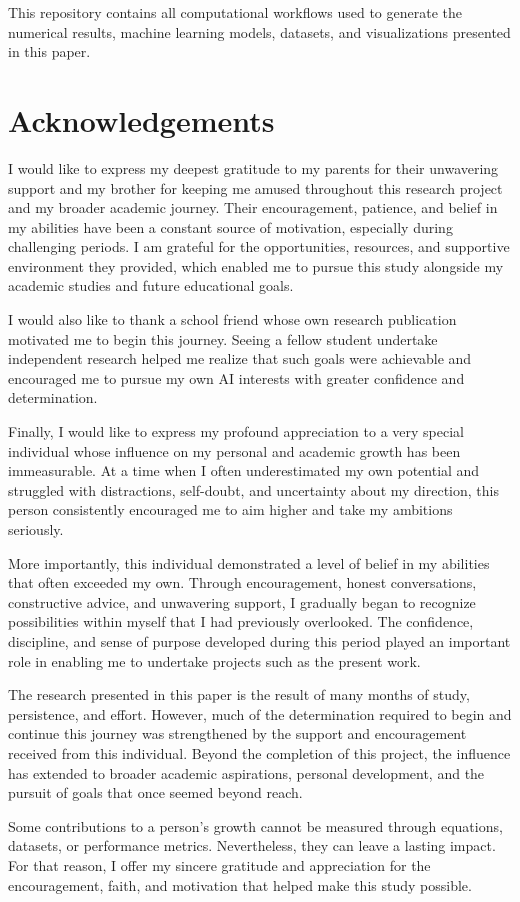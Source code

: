\documentclass[
]{article}
\begin{document}
This repository contains all computational workflows used to generate the numerical results, machine learning models, datasets, and visualizations presented in this paper.

\section{Acknowledgements}

I would like to express my deepest gratitude to my parents for their unwavering support and my brother for keeping me amused throughout this research project and my broader academic journey. Their encouragement, patience, and belief in my abilities have been a constant source of motivation, especially during challenging periods. I am grateful for the opportunities, resources, and supportive environment they provided, which enabled me to pursue this study alongside my academic studies and future educational goals.

I would also like to thank a school friend whose own research publication motivated me to begin this journey. Seeing a fellow student undertake independent research helped me realize that such goals were achievable and encouraged me to pursue my own AI interests with greater confidence and determination.

Finally, I would like to express my profound appreciation to a very special individual whose influence on my personal and academic growth has been immeasurable. At a time when I often underestimated my own potential and struggled with distractions, self-doubt, and uncertainty about my direction, this person consistently encouraged me to aim higher and take my ambitions seriously.

More importantly, this individual demonstrated a level of belief in my abilities that often exceeded my own. Through encouragement, honest conversations, constructive advice, and unwavering support, I gradually began to recognize possibilities within myself that I had previously overlooked. The confidence, discipline, and sense of purpose developed during this period played an important role in enabling me to undertake projects such as the present work.

The research presented in this paper is the result of many months of study, persistence, and effort. However, much of the determination required to begin and continue this journey was strengthened by the support and encouragement received from this individual. Beyond the completion of this project, the influence has extended to broader academic aspirations, personal development, and the pursuit of goals that once seemed beyond reach.

Some contributions to a person's growth cannot be measured through equations, datasets, or performance metrics. Nevertheless, they can leave a lasting impact. For that reason, I offer my sincere gratitude and appreciation for the encouragement, faith, and motivation that helped make this study possible.

\newpage


\end{document}
